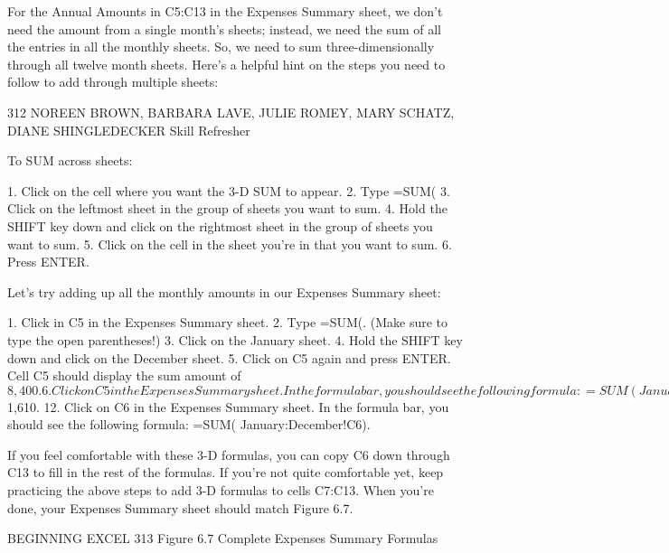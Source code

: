 For the Annual Amounts in C5:C13 in the Expenses Summary sheet, we don’t need the amount from
a single month’s sheets; instead, we need the sum of all the entries in all the monthly sheets. So, we
need to sum three-dimensionally through all twelve month sheets. Here’s a helpful hint on the steps
you need to follow to add through multiple sheets:



312 NOREEN BROWN, BARBARA LAVE, JULIE ROMEY, MARY SCHATZ, DIANE SHINGLEDECKER
Skill Refresher


To SUM across sheets:

1. Click on the cell where you want the 3-D SUM to appear.
2. Type =SUM(
3. Click on the leftmost sheet in the group of sheets you want to sum.
4. Hold the SHIFT key down and click on the rightmost sheet in the group of sheets you want to sum.
5. Click on the cell in the sheet you’re in that you want to sum.
6. Press ENTER.



Let’s try adding up all the monthly amounts in our Expenses Summary sheet:

1.    Click in C5 in the Expenses Summary sheet.
2.    Type =SUM(. (Make sure to type the open parentheses!)
3.    Click on the January sheet.
4.    Hold the SHIFT key down and click on the December sheet.
5.    Click on C5 again and press ENTER. Cell C5 should display the sum amount of $8,400.
6.    Click on C5 in the Expenses Summary sheet. In the formula bar, you should see the following
formula: =SUM( January:December!C5). This means SUM C5 in the sheets January through
December.
7.    Let’s try another 3-D SUM together. Click on C6.
8.    Type =SUM(. (Make sure to type the open parentheses!)
9.    Click on the January sheet.
10.    Hold the SHIFT key down and click on the December sheet.
11.    Click on C6 again and press ENTER. Cell C6 should now display the sum amount of $1,610.
12.    Click on C6 in the Expenses Summary sheet. In the formula bar, you should see the following
formula: =SUM( January:December!C6).

If you feel comfortable with these 3-D formulas, you can copy C6 down through C13 to fill in the
rest of the formulas. If you’re not quite comfortable yet, keep practicing the above steps to add 3-D
formulas to cells C7:C13. When you’re done, your Expenses Summary sheet should match Figure 6.7.




BEGINNING EXCEL 313
Figure 6.7 Complete Expenses Summary Formulas




